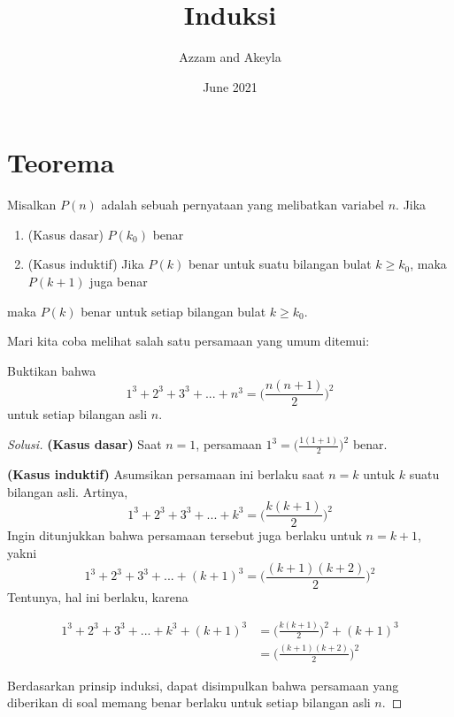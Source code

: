 \documentclass[11pt]{scrartcl}
\title{Induksi}
\author{Azzam and Akeyla}
\date{June 2021}
\begin{document}
\maketitle

\renewcommand*\contentsname{Daftar Isi}
\tableofcontents

\newpage

\section{Teorema}
\begin{theorem}
    Misalkan $P(n)$ adalah sebuah pernyataan yang melibatkan variabel $n$. Jika
    \begin{enumerate}
        \item (Kasus dasar) $P(k_0)$ benar
        \item (Kasus induktif) Jika $P(k)$ benar untuk suatu bilangan bulat $k \geq k_0$, maka $P(k+1)$ juga benar 
    \end{enumerate}
    maka $P(k)$ benar untuk setiap bilangan bulat $k \geq k_0$. 
\end{theorem}

Mari kita coba melihat salah satu persamaan yang umum ditemui:
\begin{example}
    Buktikan bahwa \[1^3 + 2^3 + 3^3 + ... + n^3 = \Big(\frac{n(n+1)}{2}\Big)^2\] untuk setiap bilangan asli $n$.
\end{example}

\begin{proof}[Solusi]

\textbf{(Kasus dasar)} Saat $n = 1$, persamaan $1^3 = \Big(\frac{1(1+1)}{2}\Big)^2$ benar.

\textbf{(Kasus induktif)} Asumsikan persamaan ini berlaku saat $n = k$ untuk $k$ suatu bilangan asli. Artinya, \[1^3 + 2^3 + 3^3 + ... + k^3 = \Big(\frac{k(k+1)}{2}\Big)^2\] Ingin ditunjukkan bahwa persamaan tersebut juga berlaku untuk $n = k + 1$, yakni \[1^3 + 2^3 + 3^3 + ... + (k+1)^3 = \Big(\frac{(k+1)(k+2)}{2}\Big)^2\]
Tentunya, hal ini berlaku, karena

\begin{align*}
    1^3 + 2^3 + 3^3 + ... + k^3 + (k+1)^3 &= \Big(\frac{k(k+1)}{2}\Big)^2 + (k+1)^3 \\
    &= \Big(\frac{(k+1)(k+2)}{2}\Big)^2
\end{align*}

Berdasarkan prinsip induksi, dapat disimpulkan bahwa persamaan yang diberikan di soal memang benar berlaku untuk setiap bilangan asli $n$.

\end{proof}
\end{document}
